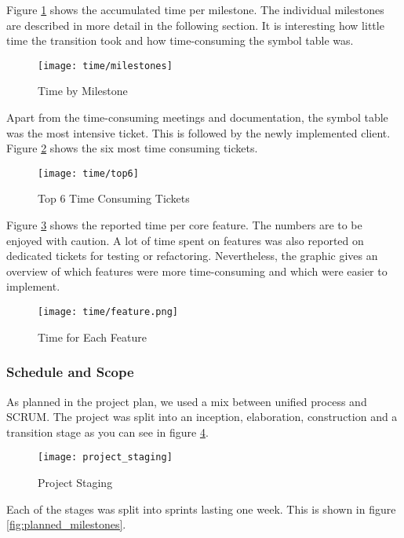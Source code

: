 Figure \ref{fig:time_milestones} shows the accumulated time per milestone.
The individual milestones are described in more detail in the following section.
It is interesting how little time the transition took and how time-consuming the symbol table was.

\begin{figure}[H]
    \centering
    \texttt{[image: time/milestones]}
    \caption{Time by Milestone}
    \label{fig:time_milestones}
\end{figure}

Apart from the time-consuming meetings and documentation, the symbol table was the most intensive ticket.
This is followed by the newly implemented client.
Figure \ref{fig:time_ticket} shows the six most time consuming tickets.

\begin{figure}[H]
    \centering
    \texttt{[image: time/top6]}
    \caption{Top 6 Time Consuming Tickets}
    \label{fig:time_ticket}
\end{figure}

Figure \ref{fig:time_feature} shows the reported time per core feature.
The numbers are to be enjoyed with caution.
A lot of time spent on features was also reported on dedicated tickets for testing or refactoring.
Nevertheless, the graphic gives an overview of which features
were more time-consuming and which were easier to implement.

\begin{figure}[H]
    \centering
    \texttt{[image: time/feature.png]}
    \caption{Time for Each Feature}
    \label{fig:time_feature}
\end{figure}

\subsubsection{Schedule and Scope}
As planned in the project plan, we used a mix between unified process and SCRUM.
The project was split into an inception, elaboration, construction and a transition stage
as you can see in figure \ref{fig:project_staging}.

\begin{figure}[H]
    \centering
    \texttt{[image: project\_staging]}
    \caption{Project Staging}
    \label{fig:project_staging}
\end{figure}

Each of the stages was split into sprints lasting one week.
This is shown in figure \ref{fig:planned_milestones}.

